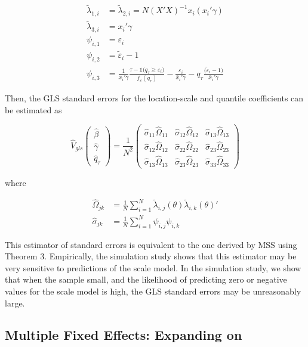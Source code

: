 \documentclass[
  12pt,
  oneside]{article}
\begin{document}
\[\begin{aligned}
\tilde \lambda_{1,i}&=\tilde \lambda_{2,i}=N (X'X)^{-1}  x_i ( x_i'\gamma) \\  
\tilde \lambda_{3,i}&=x_i' \gamma  \\
 \psi_{i,1} &= \varepsilon_i \\
 \psi_{i,2} &= \tilde \varepsilon_i -1 \\
 \psi_{i,3} &= \frac{1}{ x_i' \gamma }\frac{\tau-\mathbb{1}\big( q_\tau  \geq \varepsilon_i  \big) }{ f_{\varepsilon}(q_\tau)} - \frac{\varepsilon_i }{\bar x_i'\gamma} 
-  q_\tau \frac{(\tilde \varepsilon_i -1\big)}{\bar x_i'\gamma}
\end{aligned}
\]

Then, the GLS standard errors for the location-scale and quantile
coefficients can be estimated as

\[\hat{V}_{gls}
  \begin{pmatrix}
  \hat\beta \\
  \hat\gamma \\
  \hat q_\tau
  \end{pmatrix}
 = \frac{1}{N^2} 
 \begin{pmatrix}
 \hat\sigma_{11} \hat\Omega_{11} & \hat\sigma_{12} \hat\Omega_{12} & \hat\sigma_{13} \hat\Omega_{13} \\
 \hat\sigma_{12} \hat\Omega_{12} & \hat\sigma_{22} \hat\Omega_{22} & \hat\sigma_{23} \hat\Omega_{23} \\
 \hat\sigma_{13} \hat\Omega_{13} & \hat\sigma_{23} \hat\Omega_{23} & \hat\sigma_{33} \hat\Omega_{33}
  \end{pmatrix}
\]

where

\[\begin{aligned}
\hat\Omega_{jk} &= \frac{1}{N} \sum_{i=1}^N \tilde \lambda_{i,j}(\theta) \tilde \lambda_{i,k}(\theta)' \\
\hat\sigma_{jk} &= \frac{1}{N} \sum_{i=1}^N \psi_{i,j} \psi_{i,k}
\end{aligned}
\]

This estimator of standard errors is equivalent to the one derived by
MSS using Theorem 3. Empirically, the simulation study shows that this
estimator may be very sensitive to predictions of the scale model. In
the simulation study, we show that when the sample small, and the
likelihood of predicting zero or negative values for the scale model is
high, the GLS standard errors may be unreasonably large.

\subsection{\texorpdfstring{Multiple Fixed Effects: Expanding on
\citet{mss2019}}{Multiple Fixed Effects: Expanding on @mss2019}}\label{multiple-fixed-effects-expanding-on-mss2019}
\end{document}
